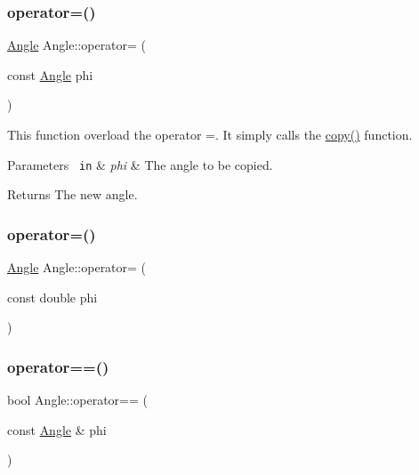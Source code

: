 \mbox{\label{class_angle_a93da39f08e2e110e278bb94d1c279ac6}} 
\subsubsection{\texorpdfstring{operator=()}{operator=()}\hspace{0.1cm}{\footnotesize\ttfamily [1/2]}}
{\footnotesize\ttfamily \mbox{\hyperlink{class_angle}{Angle}} Angle\+::operator= (\begin{DoxyParamCaption}\item[{const \mbox{\hyperlink{class_angle}{Angle}}}]{phi }\end{DoxyParamCaption})\hspace{0.3cm}{\ttfamily [inline]}}

This function overload the operator =. It simply calls the {\ttfamily \mbox{\hyperlink{class_angle_ab1c34d25d3235e639313e5d48d98a6f6}{copy()}}} function. 
\begin{DoxyParams}[1]{Parameters}
\mbox{\texttt{ in}}  & {\em phi} & The angle to be copied. \\
\hline
\end{DoxyParams}
\begin{DoxyReturn}{Returns}
The new angle. 
\end{DoxyReturn}
\mbox{\label{class_angle_adf9e68cdeac72b3754bd7d0993a37220}} 
\subsubsection{\texorpdfstring{operator=()}{operator=()}\hspace{0.1cm}{\footnotesize\ttfamily [2/2]}}
{\footnotesize\ttfamily \mbox{\hyperlink{class_angle}{Angle}} Angle\+::operator= (\begin{DoxyParamCaption}\item[{const double}]{phi }\end{DoxyParamCaption})\hspace{0.3cm}{\ttfamily [inline]}}

\mbox{\label{class_angle_affdc9a2590df21c00fcbe01e5dadaf25}} 
\subsubsection{\texorpdfstring{operator==()}{operator==()}}
{\footnotesize\ttfamily bool Angle\+::operator== (\begin{DoxyParamCaption}\item[{const \mbox{\hyperlink{class_angle}{Angle}} \&}]{phi }\end{DoxyParamCaption})\hspace{0.3cm}{\ttfamily [inline]}}

